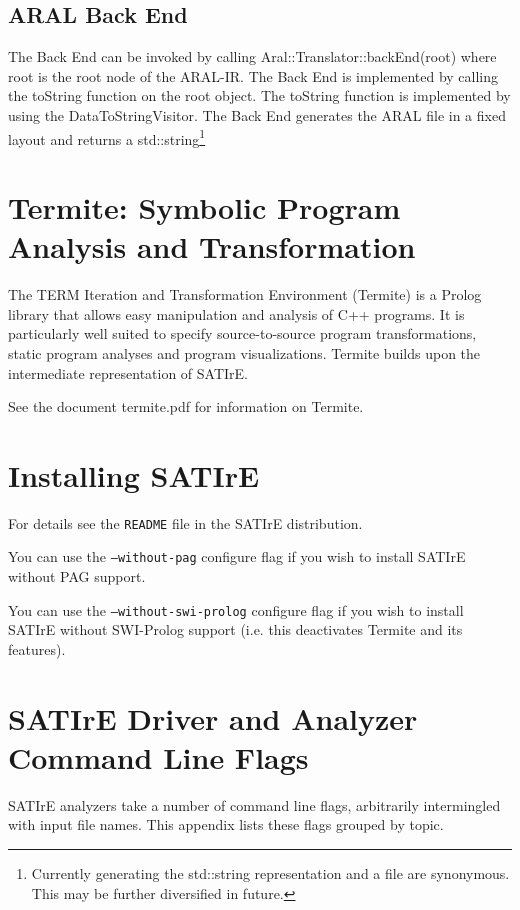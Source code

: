 \documentclass[a4paper,12pt]{report}
\begin{document}
\section{ARAL Back End}

The Back End can be invoked by calling Aral::Translator::backEnd(root)
where root is the root node of the ARAL-IR. The Back End is
implemented by calling the toString function on the root object. The
toString function is implemented by using the DataToStringVisitor.
The Back End generates the ARAL file in a fixed layout and returns a
std::string\footnote{Currently generating the std::string representation and a file
are synonymous. This may be further diversified in future.}


\chapter{Termite: Symbolic Program Analysis and Transformation}
\label{chap:termite}

The TERM Iteration and Transformation Environment (Termite) is a
Prolog library that allows easy manipulation and analysis of C++
programs. It is particularly well suited to specify source-to-source
program transformations, static program analyses and program
visualizations. Termite builds upon the intermediate representation of
SATIrE.

See the document termite.pdf for information on Termite. 

\appendix

\chapter{Installing SATIrE}
\label{appendix:installing}

For details see the \texttt{README} file in the SATIrE distribution. 

You can use the \texttt{--without-pag} configure flag if you wish to install
SATIrE without PAG support.

You can use the \texttt{--without-swi-prolog} configure flag if you wish to
install SATIrE without SWI-Prolog support (i.e. this deactivates
Termite and its features).

\chapter{SATIrE Driver and Analyzer Command Line Flags}
\label{appendix:command_line}

SATIrE analyzers take a number of command line flags, arbitrarily
intermingled with input file names. This appendix lists these flags grouped
by topic.
\end{document}

